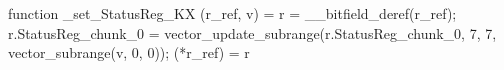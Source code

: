 function _set_StatusReg_KX (r_ref, v) = {
    r = __bitfield_deref(r_ref);
    r.StatusReg_chunk_0 = vector_update_subrange(r.StatusReg_chunk_0, 7, 7, vector_subrange(v, 0, 0));
    (*r_ref) = r
}
